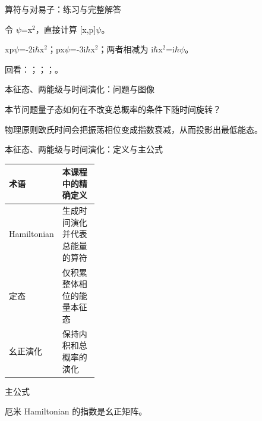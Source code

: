\begin{frame}[t]{算符与对易子：练习与完整解答}
\footnotesize
\begin{block}{}令 \ensuremath{\psi}=x\ensuremath{^{2}}，直接计算 [x,p]\ensuremath{\psi}。\end{block}
\begin{exampleblock}{}xp\ensuremath{\psi}=-2i\ensuremath{\hbar}x\ensuremath{^{2}}；px\ensuremath{\psi}=-3i\ensuremath{\hbar}x\ensuremath{^{2}}；两者相减为 i\ensuremath{\hbar}x\ensuremath{^{2}}=i\ensuremath{\hbar}\ensuremath{\psi}。\end{exampleblock}
\vfill
\scriptsize 回看：；；；。
\end{frame}

\begin{frame}[t]{本征态、两能级与时间演化：问题与图像}
\footnotesize
\begin{block}{本节问题}量子态如何在不改变总概率的条件下随时间旋转？\end{block}
\begin{block}{物理原则}\quad 欧氏时间会把振荡相位变成指数衰减，从而投影出最低能态。\end{block}
\end{frame}

\begin{frame}[t]{本征态、两能级与时间演化：定义与主公式}
\footnotesize\begin{tabularx}{\linewidth}{p{0.30\linewidth}Y}
\toprule 术语 & 本课程中的精确定义\\\midrule
{} Hamiltonian & 生成时间演化并代表总能量的算符\\
 定态 & 仅积累整体相位的能量本征态\\
 幺正演化 & 保持内积和总概率的演化\\
\bottomrule\end{tabularx}\vspace{0.15cm}
\begin{block}{ 主公式}\centering{}\end{block}
厄米 Hamiltonian 的指数是幺正矩阵。
\end{frame}

